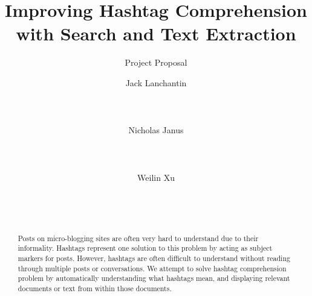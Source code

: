 \documentclass{sig-alternate}
\begin{document}
%

\title{Improving Hashtag Comprehension with Search and Text Extraction
}
\subtitle{Project Proposal}

\author{
\alignauthor
Jack Lanchantin\\
       \\
       \\
       \\
\alignauthor
Nicholas Janus\\
       \\
       \\
       \\
\alignauthor 
Weilin Xu\\
       \\
       \\
       \\
}

\maketitle
\begin{abstract}
Posts on micro-blogging sites are often very hard to understand due to their informality. Hashtags represent one solution to this problem by acting as subject markers for posts.  However, hashtags are often difficult to understand without reading through multiple posts or conversations. We attempt to solve hashtag comprehension problem by automatically understanding what hashtags mean, and displaying relevant documents or text from within those documents. 
\end{abstract}

\end{document}
